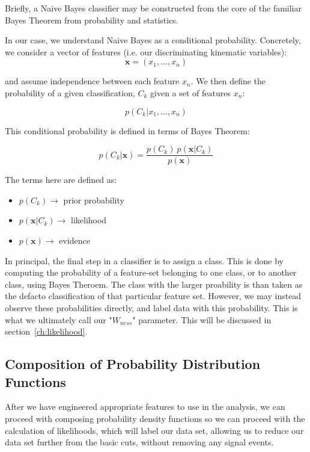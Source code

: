 Briefly, a Naive Bayes classifier may be constructed from the core of the
familiar Bayes Theorem from probability and statistics.

In our case, we understand Naive Bayes as a conditional probability. Concretely,
we consider a vector of features (i.e. our discriminating kinematic variables):
\begin{equation}
	\label{eq:feature_vector}
\mathbf{x} = (x_1, \dots, x_n)
\end{equation}

and assume independence between each feature $x_n$. We then define the
probability of a given classification, $C_k$ given a set of features $x_n$:

\begin{equation}
	\label{eq:cond_probabilty}
p(C_k \vert x_1, \dots, x_n)
\end{equation}

This conditional probability is defined in terms of Bayes Theorem:

\begin{equation}
	\label{eq:bayes_theorm}
p(C_k \vert \mathbf{x}) = \frac{p(C_k) \ p(\mathbf{x} \vert C_k)}{p(\mathbf{x})}
\end{equation}

The terms here are defined as:
\begin{itemize}
	\item $p(C_k)\rightarrow$ prior probability
	\item $p(\mathbf{x} \vert C_k)\rightarrow$ likelihood
	\item $p(\mathbf{x})\rightarrow$ evidence
\end{itemize}

In principal, the final step in a classifier is to assign a class. This is done
by computing the probability of a feature-set belonging to one class, or to
another class, using Bayes Theroem. The class with the larger proability is than
taken as the defacto classification of that particular feature set. However, we
may instead observe these probabilities directly, and label data with this
probability. This is what we ultimately call our "$W_{ness}$" parameter. This
will be discussed in section~\ref{ch:likelihood}.

\subsection{Composition of Probability Distribution Functions}
After we have engineered appropriate features to use in the analysis, we can
proceed with composing probability density functions so we can proceed with the
calculation of likelihoods, which will label our data set, allowing us to reduce
our data set further from the basic cuts, without removing any signal events.


